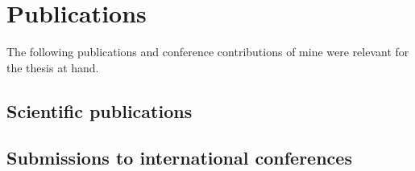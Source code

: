 

\chapter*{Publications}

The following publications and conference contributions of mine were relevant for the thesis at hand.


\section*{Scientific publications}
\begin{refsection}
\nocite{Halchenko2021, NISO2022119623, HankePestilliWagnerMarkiewiczPolineHalchenko+2021+17+25, wagner2020datalad, wagner2022fairly}
\begin{refcontext}[sorting=nyt]  
	\printbibliography[heading=none, resetnumbers=true]
\end{refcontext}
\end{refsection}

\section*{Submissions to international conferences}
\begin{refsection}
\nocite{wagner202310, wagnerohbm2022, wagnerohbm2021, poldrackohbm2020, wagner_adina_s_2020_7906718}

\begin{refcontext}[sorting=nyt]  
	\printbibliography[heading=none, resetnumbers=true]
\end{refcontext}
\end{refsection}

